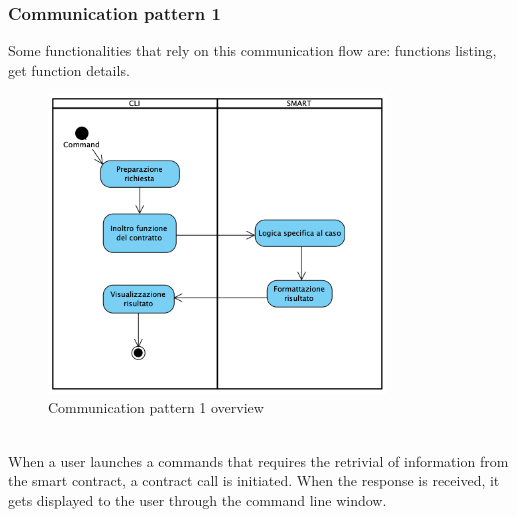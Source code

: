 \subsubsection{Communication pattern 1}
Some functionalities that rely on this communication flow are: functions listing, get function details.
\begin{figure}[h]
	\centering
	\includegraphics[width=0.8\textwidth]{res/img/pattern1.png}
	\caption{Communication pattern 1 overview}
\end{figure}\\
\noindent When a user launches a commands that requires the retrivial of information from the smart contract, a contract call is initiated. When the response is received, it gets displayed to the user through the command line window.\newline 
\newpage
